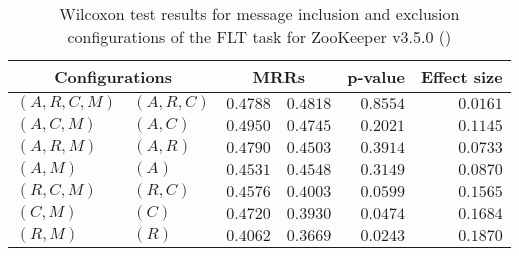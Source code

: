 
\begin{table}
\begin{spacing}{1.2}
\centering
\caption{Wilcoxon test results for message inclusion and exclusion configurations of the FLT task for ZooKeeper v3.5.0 (\ctwo)}
\label{table:versus-wilcox-zookeeper-flt-message}
\begin{tabular}{ll|rr|rr}
\toprule
      \multicolumn{2}{c|}{Configurations} &                \multicolumn{2}{c|}{MRRs} &             p-value & Effect size \\
\midrule
 $(A,R,C,M)$ &  $(A,R,C)$ &       $0.4788$ &  $\bm{0.4818}$ & $0.8554$ &    $0.0161$ \\
   $(A,C,M)$ &    $(A,C)$ &  $\bm{0.4950}$ &       $0.4745$ & $0.2021$ &    $0.1145$ \\
   $(A,R,M)$ &    $(A,R)$ &  $\bm{0.4790}$ &       $0.4503$ & $0.3914$ &    $0.0733$ \\
     $(A,M)$ &      $(A)$ &       $0.4531$ &  $\bm{0.4548}$ & $0.3149$ &    $0.0870$ \\
   $(R,C,M)$ &    $(R,C)$ &  $\bm{0.4576}$ &       $0.4003$ & $0.0599$ &    $0.1565$ \\
     $(C,M)$ &      $(C)$ &  $\bm{0.4720}$ &       $0.3930$ & $0.0474$ &    $0.1684$ \\
     $(R,M)$ &      $(R)$ &  $\bm{0.4062}$ &       $0.3669$ & $0.0243$ &    $0.1870$ \\
\bottomrule
\end{tabular}

\end{spacing}
\end{table}

